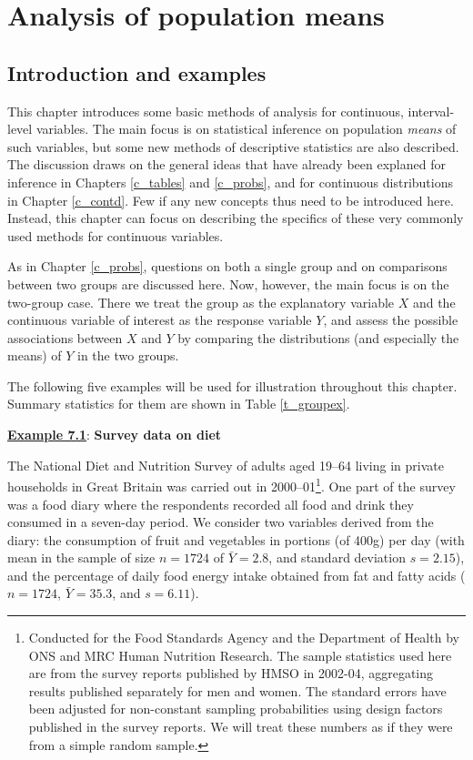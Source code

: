\chapter{Analysis of population means}
\label{c_means}

\section{Introduction and examples}
\label{s_means_intro}

This chapter introduces some basic methods of analysis for continuous,
interval-level variables. The main focus is on statistical inference on
population \emph{means} of such variables, but
some new methods of descriptive statistics are also described. The
discussion draws on the general ideas that have already been explaned
for inference in Chapters \ref{c_tables} and \ref{c_probs}, and for
continuous distributions in Chapter \ref{c_contd}. Few if any new
concepts thus need to be introduced here. Instead, this chapter can
focus on describing the specifics of these very commonly used methods
for continuous variables.

As in Chapter \ref{c_probs}, questions on both a single group and on
comparisons between two groups are discussed here. Now, however, the
main focus is on the two-group case. There we treat the group as the
explanatory variable $X$ and the continuous variable of interest as the
response variable $Y$, and assess the possible associations between $X$
and $Y$ by comparing the distributions (and especially the means) of $Y$
in the two groups.

The following five examples will be used for illustration throughout
this chapter. Summary statistics for them are
shown in Table \ref{t_groupex}.

\underline{\textbf{Example 7.1}}: \textbf{Survey data on diet}

The National Diet and Nutrition Survey of adults aged 19--64
living in private households in Great Britain was carried out in
2000--01\footnote{Conducted for the Food
Standards Agency and the Department of Health by ONS and MRC Human
Nutrition Research. The sample statistics used here
are from the survey reports
published by HMSO in 2002-04, aggregating results published
separately for men and women.
The standard errors have been
adjusted for non-constant sampling probabilities using
design factors published in the survey reports. We will
treat these numbers as if they were from a simple random sample.}.
One part of the survey
was a food diary where the respondents recorded all food and
drink they consumed in a seven-day period. We consider two
variables derived from the diary: the
consumption of fruit and vegetables in portions (of 400g) per day
(with mean in the sample of size $n=1724$ of
$\bar{Y}=2.8$, and standard deviation $s=2.15$), and
the percentage of daily food energy intake obtained from fat
and fatty acids ($n=1724$, $\bar{Y}=35.3$, and
$s=6.11$).

